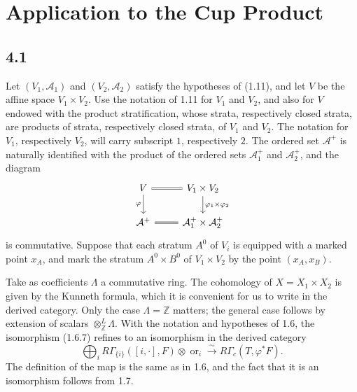 \documentclass[11pt]{article}
\theoremstyle{definition}
\newcommand{\ZZ}{\mathbb Z}
\newcommand{\ornt}{\operatorname{or}}
\begin{document}
\section{Application to the Cup Product}

\subsection*{4.1}
Let $(V_1,\mathcal A_1)$ and $(V_2,\mathcal A_2)$ satisfy the hypotheses of (1.11), and let $V$ be the affine space $V_1\times V_2$.  Use the notation of 1.11 for $V_1$ and $V_2$, and also for $V$ endowed with the product stratification, whose strata, respectively closed strata, are products of strata, respectively closed strata, of $V_1$ and $V_2$.  The notation for $V_1$, respectively $V_2$, will carry subscript $1$, respectively $2$.  The ordered set $\mathcal A^+$ is naturally identified with the product of the ordered sets $\mathcal A_1^+$ and $\mathcal A_2^+$, and the diagram
\[
\begin{tikzcd}
V \arrow[r,equal] \arrow[d,"\varphi"'] & V_1\times V_2 \arrow[d,"\varphi_1\times\varphi_2"]\\
\mathcal A^+ \arrow[r,equal] & \mathcal A_1^+\times\mathcal A_2^+
\end{tikzcd}
\]
is commutative.  Suppose that each stratum $A^0$ of $V_i$ is equipped with a marked point $x_A$, and mark the stratum $A^0\times B^0$ of $V_1\times V_2$ by the point $(x_A,x_B)$.

Take as coefficients $\Lambda$ a commutative ring.  The cohomology of $X=X_1\times X_2$ is given by the Kunneth formula, which it is convenient for us to write in the derived category.  Only the case $\Lambda=\ZZ$ matters; the general case follows by extension of scalars $\otimes^L_\ZZ\Lambda$.  With the notation and hypotheses of 1.6, the isomorphism (1.6.7) refines to an isomorphism in the derived category
\begin{equation}
\bigoplus_i R\Gamma_{\{i\}}([i,\cdot],F)\otimes\ornt_i\xrightarrow{\sim}R\Gamma_c(T,\varphi^*F).\tag{4.1.1}
\end{equation}
The definition of the map is the same as in 1.6, and the fact that it is an isomorphism follows from 1.7.
\end{document}
